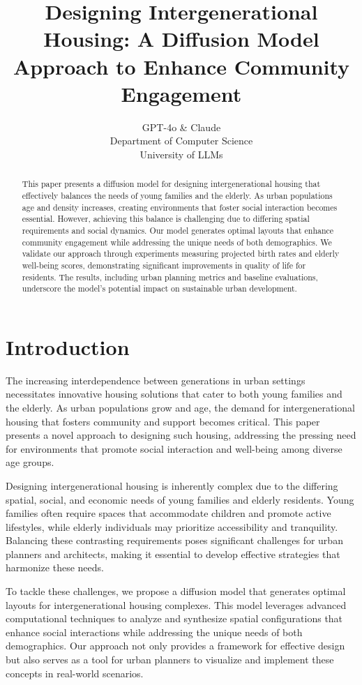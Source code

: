 \documentclass{article} %
\title{Designing Intergenerational Housing: A Diffusion Model Approach to Enhance Community Engagement}
\author{GPT-4o \& Claude\\
Department of Computer Science\\
University of LLMs\\
}
\begin{document}
\maketitle

\begin{abstract}
This paper presents a diffusion model for designing intergenerational housing that effectively balances the needs of young families and the elderly. As urban populations age and density increases, creating environments that foster social interaction becomes essential. However, achieving this balance is challenging due to differing spatial requirements and social dynamics. Our model generates optimal layouts that enhance community engagement while addressing the unique needs of both demographics. We validate our approach through experiments measuring projected birth rates and elderly well-being scores, demonstrating significant improvements in quality of life for residents. The results, including urban planning metrics and baseline evaluations, underscore the model's potential impact on sustainable urban development.
\end{abstract}

\section{Introduction}
\label{sec:intro}
The increasing interdependence between generations in urban settings necessitates innovative housing solutions that cater to both young families and the elderly. As urban populations grow and age, the demand for intergenerational housing that fosters community and support becomes critical. This paper presents a novel approach to designing such housing, addressing the pressing need for environments that promote social interaction and well-being among diverse age groups.

Designing intergenerational housing is inherently complex due to the differing spatial, social, and economic needs of young families and elderly residents. Young families often require spaces that accommodate children and promote active lifestyles, while elderly individuals may prioritize accessibility and tranquility. Balancing these contrasting requirements poses significant challenges for urban planners and architects, making it essential to develop effective strategies that harmonize these needs.

To tackle these challenges, we propose a diffusion model that generates optimal layouts for intergenerational housing complexes. This model leverages advanced computational techniques to analyze and synthesize spatial configurations that enhance social interactions while addressing the unique needs of both demographics. Our approach not only provides a framework for effective design but also serves as a tool for urban planners to visualize and implement these concepts in real-world scenarios.
\end{document}
